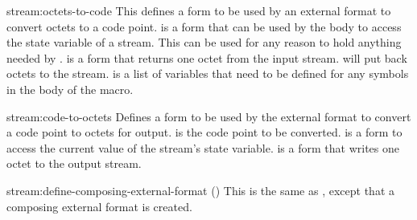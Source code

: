\begin{defmac}{stream:}{octets-to-code}{\args {} 
     \amprest{} }
  This defines a form to be used by an external format to convert
  octets to a code point.   is a form that can be used by
  the body to access the state variable of a stream.  This can be used
  for any reason to hold anything needed by .
   is a form that returns one octet from the input stream.
   will put back  octets to the stream.   is a
  list of variables that need to be defined for any symbols in the
  body of the macro.
\end{defmac}

\begin{defmac}{stream:}{code-to-octets}{\args {} 
     \amprest{} }
  Defines a form to be used by the external format to convert a code
  point to octets for output.   is the code point to be
  converted.   is a form to access the current value of the
  stream's state variable.   is a form that writes one
  octet to the output stream.
\end{defmac}

\begin{defmac}{stream:}{define-composing-external-format}{\args {}
    () 
    }
  This is the same as , except that a
  composing external format is created.
\end{defmac}
